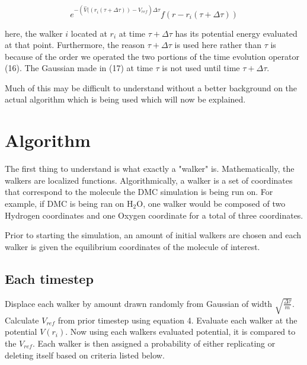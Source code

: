 \documentclass{article}
\begin{document}
\begin{equation} \label{eqn}
e^{-(\hat{V}{((r_{i}(\tau+\Delta\tau))}-V_{ref})\Delta\tau}f(r-r_{i}(\tau+\Delta\tau))
\end{equation}

here, the walker $i$ located at $r_{i}$ at time $\tau+\Delta\tau$ has its potential energy evaluated at that point. Furthermore, the reason $\tau+\Delta\tau$ is used here rather than $\tau$ is because of the order we operated the two portions of the time evolution operator (16). The Gaussian made in (17) at time $\tau$ is not used until time $\tau+\Delta\tau$. 

Much of this may be difficult to understand without a better background on the actual algorithm which is being used which will now be explained.

\section{Algorithm}
The first thing to understand is what exactly a "walker" is. Mathematically, the walkers are localized functions. Algorithmically, a walker is a set of coordinates that correspond to the molecule the DMC simulation is being run on. For example, if DMC is being ran on H$_{2}$O, one walker would be composed of two Hydrogen coordinates and one Oxygen coordinate for a total of three coordinates.

Prior to starting the simulation, an amount of initial walkers are chosen and each walker is given the equilibrium coordinates of the molecule of interest. 
\subsection{Each timestep}
Displace each walker by amount drawn randomly from Gaussian of width $\sqrt{\frac{\Delta\tau}{m}}$. Calculate $V_{ref}$ from prior timestep using equation 4. Evaluate each walker at the potential $V(r_{i})$. Now using each walkers evaluated potential, it is compared to the $V_{ref}$. Each walker is then assigned a probability of either replicating or deleting itself based on criteria listed below.


\end{document}
